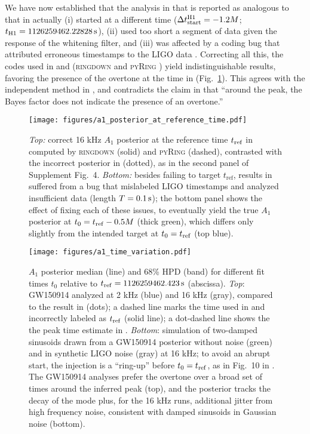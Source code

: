 \documentclass[aps,prd,twocolumn,superscriptaddress,preprintnumbers,floatfix,nofootinbib]{revtex4-2}
\begin{document}
We have now established that the analysis in \cite{Cotesta:2022pci} that is reported as
analogous to that in \cite{Isi:2019aib} actually
(i) started at a different time ($\Delta t_{\rm start}^{\rm H1} = -1.2 M$; $t_{\rm H1} = 1126259462.22828 \, \mathrm{s}$),
(ii) used too short a segment of data given the response of the whitening filter, and
(iii) was affected by a coding bug that attributed erroneous timestamps to the LIGO data \cite{bug}.
Correcting all this, the codes used in
\cite{Isi:2022mhy} and \cite{Cotesta:2022pci} (\textsc{ringdown} \cite{ringdown}
and \textsc{pyRing} \cite{pyRing_soft}) yield indistinguishable
results, favoring the presence of the overtone at the time in \cite{Isi:2019aib}
(Fig.~\ref{fig:reftime}). This agrees with the independent
method in \cite{Finch:2022ynt}, and contradicts the claim in
\cite{Cotesta:2022pci} that ``around the peak, the Bayes factor does not
indicate the presence of an overtone.''

\begin{figure}
  \texttt{[image: figures/a1\_posterior\_at\_reference\_time.pdf]}
  \caption{\emph{Top:} correct 16 kHz $A_1$ posterior at the reference time $t_{\rm ref}$ in \cite{Isi:2019aib} computed by \textsc{ringdown} (solid) and \textsc{pyRing} (dashed), contrasted with the incorrect posterior in \cite{Cotesta:2022pci} (dotted), as in the second panel of Supplement Fig.~4.
  \emph{Bottom:}
  besides failing to target $t_\mathrm{ref}$, results in~\cite{Cotesta:2022pci} suffered from a bug that mislabeled LIGO timestamps and analyzed insufficient data (length $T = 0.1\,{\rm s}$); the bottom panel shows the effect of fixing each of these issues, to eventually yield the true $A_1$ posterior at $t_0 = t_{\rm ref} - 0.5 M$ (thick green), which differs only slightly from the intended target at $t_0 = t_{\rm ref}$ (top blue).
  \label{fig:reftime}
}
\end{figure}

\begin{figure}
  \texttt{[image: figures/a1\_time\_variation.pdf]}
  \caption{$A_1$ posterior median (line) and 68\% HPD (band) for different fit times $t_0$ relative to $t_{\rm ref} = 1126259462.423 \, \mathrm{s}$ (abscissa). \emph{Top}: GW150914 analyzed at 2 kHz (blue) and 16 kHz (gray), compared to the result in \cite{Finch:2022ynt} (dots); a dashed line marks the time used in \cite{Cotesta:2022pci} and incorrectly labeled as $t_{\rm ref}$ (solid line); a dot-dashed line shows the the peak time estimate in \cite{Cotesta:2022pci}.
  \emph{Bottom}: simulation of two-damped sinusoids drawn from a GW150914 posterior without noise (green) and in synthetic LIGO noise (gray) at 16 kHz; to avoid an abrupt start, the injection is a ``ring-up'' before $t_0 = t_{\rm ref}$, as in Fig.~10 in \cite{Isi:2021iql}.
  The GW150914 analyses prefer the overtone over a broad set of times around the inferred peak (top), and the posterior tracks the decay of the mode plus, for the 16 kHz runs, additional jitter from high frequency noise, consistent with damped sinusoids in Gaussian noise (bottom).}
  \label{fig:variation}
\end{figure}
\end{document}
